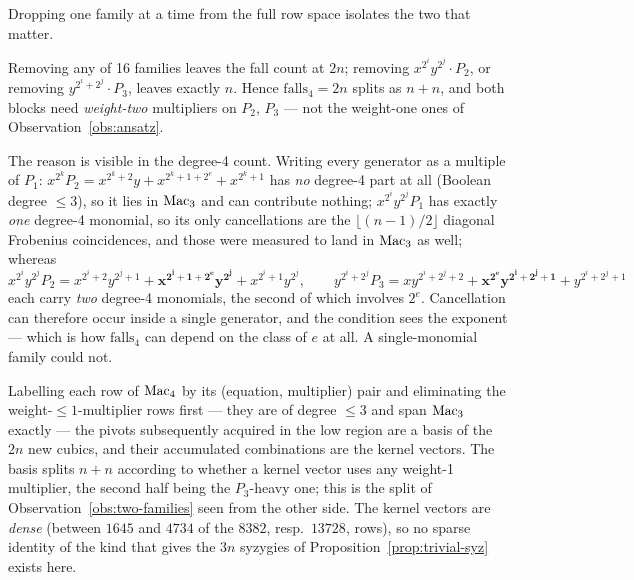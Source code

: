 Dropping one family at a time from the full row space isolates the two that matter.
\begin{observation}\label{obs:two-families}
 Removing any of 16 families leaves the fall count
at $2n$; removing $x^{2^i}y^{2^j}\cdot P_2$, or removing $y^{2^i+2^j}\cdot P_3$, leaves exactly $n$.
Hence $\mathrm{falls}_4=2n$ splits as $n+n$, and both blocks need \emph{weight-two} multipliers on
$P_2$, $P_3$ --- not the weight-one ones of Observation~\ref{obs:ansatz}.
\end{observation}

The reason is visible in the degree-4 count. Writing every generator as a multiple of $P_1$:
$x^{2^k}P_2=x^{2^k+2}y+x^{2^k+1+2^e}+x^{2^k+1}$ has \emph{no} degree-4 part at all (Boolean degree
$\le3$), so it lies in $\mathrm{Mac}_3$ and can contribute nothing; $x^{2^i}y^{2^j}P_1$ has exactly
\emph{one} degree-4 monomial, so its only cancellations are the $\lfloor(n-1)/2\rfloor$ diagonal
Frobenius coincidences, and those were measured to land in $\mathrm{Mac}_3$ as well; whereas
\[
  x^{2^i}y^{2^j}P_2=x^{2^i+2}y^{2^j+1}+\mathbf{x^{2^i+1+2^e}y^{2^j}}+x^{2^i+1}y^{2^j},\qquad
  y^{2^i+2^j}P_3=xy^{2^i+2^j+2}+\mathbf{x^{2^e}y^{2^i+2^j+1}}+y^{2^i+2^j+1}
\]
each carry \emph{two} degree-4 monomials, the second of which involves $2^e$. Cancellation can
therefore occur inside a single generator, and the condition sees the exponent --- which is how
$\mathrm{falls}_4$ can depend on the class of $e$ at all. A single-monomial family could not.

\begin{observation}\label{obs:basis}
 Labelling each row of $\mathrm{Mac}_4$ by its (equation,
multiplier) pair and eliminating the weight-$\le1$-multiplier rows first --- they are of degree
$\le3$ and span $\mathrm{Mac}_3$ exactly --- the pivots subsequently acquired in the low region are a basis
of the $2n$ new cubics, and their accumulated combinations are the kernel vectors. The basis splits
$n+n$ according to whether a kernel vector uses any weight-1 multiplier, the second half being the
$P_3$-heavy one; this is the split of Observation~\ref{obs:two-families} seen from the other side.
The kernel vectors are \emph{dense} (between $1645$ and $4734$ of the $8382$, resp.\ $13728$, rows),
so no sparse identity of the kind that gives the $3n$ syzygies of
Proposition~\ref{prop:trivial-syz} exists here.
\end{observation}

